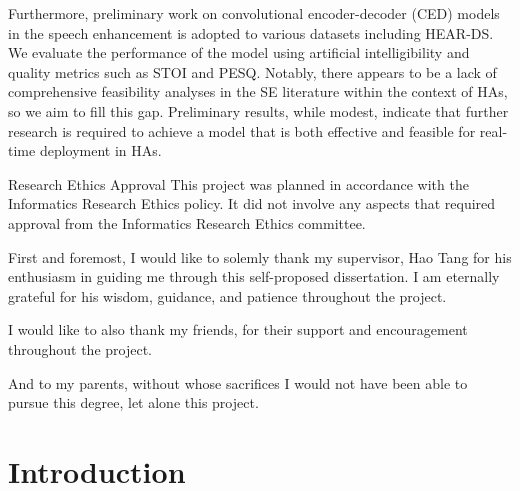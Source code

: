 \documentclass[logo,bsc,singlespacing,parskip,online]{infthesis}
\begin{document}
\begin{preliminary}
{   Furthermore, preliminary work on convolutional encoder-decoder (CED) 
   models in the speech enhancement is adopted to various datasets 
   including HEAR-DS. We evaluate the performance of the model 
   using artificial intelligibility and quality metrics such as STOI and PESQ. 
   Notably, there appears to be a lack of comprehensive feasibility analyses in 
   the SE literature within the context of HAs, so we aim to fill this gap. 
   Preliminary results, while modest, indicate that further research is required 
   to achieve a model that is both effective and feasible for real-time deployment in HAs.
}

\maketitle

\newenvironment{ethics}
   {\begin{frontenv}{Research Ethics Approval}{\LARGE}}
   {\end{frontenv}\newpage}

\begin{ethics}
This project was planned in accordance with the Informatics Research
Ethics policy. It did not involve any aspects that required approval
from the Informatics Research Ethics committee.

\standarddeclaration
\end{ethics}


\begin{acknowledgements}
First and foremost, I would like to solemly thank my supervisor, Hao Tang for 
his enthusiasm in guiding me through this self-proposed dissertation. I am eternally grateful for his wisdom, guidance, and patience throughout the project.

I would like to also thank my friends, for their support and encouragement throughout the project. 

And to my parents, without whose sacrifices I would not have been able to pursue this degree, let alone this project.
\end{acknowledgements}


\tableofcontents
\end{preliminary}


\chapter{Introduction}
\end{document}
